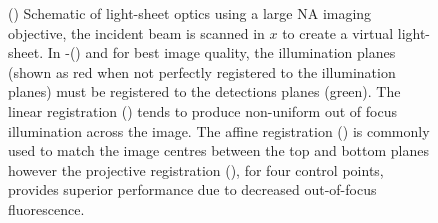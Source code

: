\begin{figure}
    \caption{
    () Schematic of %
    \gls{light-sheet} optics using a large \gls{NA} imaging objective, the incident beam is scanned in \(x\) to create a \gls{virtual light-sheet}.
    In -() and for best image quality, the illumination planes (shown as red when not perfectly registered to the illumination planes) must be registered to the detections planes (green).
    The linear registration () tends to produce non-uniform out of focus illumination across the image.
    The affine registration () is commonly used to match the image centres between the top and bottom planes however the projective registration (), for four control points, provides superior performance due to decreased out-of-focus fluorescence.
    }
    \label{fig:homography/geometry}
\end{figure}

%


